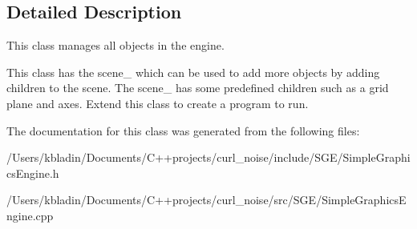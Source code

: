 \subsection{Detailed Description}
This class manages all objects in the engine. 

This class has the scene\-\_\- which can be used to add more objects by adding children to the scene. The scene\-\_\- has some predefined children such as a grid plane and axes. Extend this class to create a program to run. 

The documentation for this class was generated from the following files\-:\begin{DoxyCompactItemize}
\item 
/\-Users/kbladin/\-Documents/\-C++projects/curl\-\_\-noise/include/\-S\-G\-E/Simple\-Graphics\-Engine.\-h\item 
/\-Users/kbladin/\-Documents/\-C++projects/curl\-\_\-noise/src/\-S\-G\-E/Simple\-Graphics\-Engine.\-cpp\end{DoxyCompactItemize}
